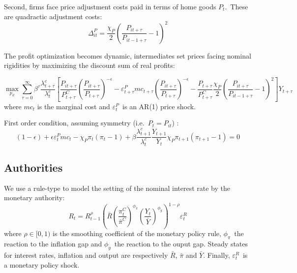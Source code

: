 \documentclass[a4paper,12pt]{article}%
\begin{document}
Second, firms face price adjustment costs paid in terms of home goods $P_{t}%
$.\ These are quadractic adjustment costs:%
\begin{equation}
\Delta_{it}^{P}=\frac{\chi_{P}}{2}\left(  \frac{P_{it+\tau}}{P_{it-1+\tau}%
}-1\right)  ^{2}%
\end{equation}


The profit optimization becomes dynamic, intermediates set prices facing
nominal rigidities by maximizing the discount sum of real profits:%

\begin{equation}
\max_{p_{it}}%
{\displaystyle\sum\limits_{\tau=0}^{\infty}}
\beta^{\tau}\frac{\lambda_{t+\tau}^{c}}{\lambda_{t}^{c}}\left[  \frac
{P_{it+\tau}}{P_{t+\tau}^{C}}\left(  \frac{P_{it+\tau}}{P_{t+\tau}}\right)
^{-\epsilon}-\varepsilon_{t+\tau}^{P}mc_{t+\tau}\left(  \frac{P_{it+\tau}%
}{P_{t+\tau}}\right)  ^{-\epsilon}-\frac{P_{t+\tau}}{P_{t+\tau}^{C}}\frac
{\chi_{P}}{2}\left(  \frac{P_{it+\tau}}{P_{it-1+\tau}}-1\right)  ^{2}\right]
Y_{t+\tau}%
\end{equation}
where $mc_{t}$ is the marginal cost and $\varepsilon_{t}^{P}$\ is an AR(1)
price shock.

First order condition, assuming symmetry (i.e.\ $P_{t}=P_{it}$) :%
\begin{equation}
\left(  1-\epsilon\right)  +\epsilon\varepsilon_{t}^{P}mc_{t}-\chi_{P}\pi
_{t}\left(  \pi_{t}-1\right)  +\beta\frac{\lambda_{t+1}^{c}}{\lambda_{t}^{c}%
}\frac{Y_{t+1}}{Y_{t}}\chi_{P}\pi_{t+1}\left(  \pi_{t+1}-1\right)  =0
\end{equation}


\subsection{Authorities}

We use a \cite{taylor1993discretion} rule-type to model the setting of the
nominal interest rate by the monetary authority:%
\begin{equation}
R_{t}=R_{t-1}^{\rho}\left(  \bar{R}\left(  \frac{\pi_{t}^{C}}{\bar{\pi}^{C}%
}\right)  ^{\phi_{\pi}}\left(  \frac{Y_{t}}{\bar{Y}}\right)  ^{\phi_{y}%
}\right)  ^{1-\rho}\varepsilon_{t}^{R}%
\end{equation}
where $\rho\in\lbrack0,1)$ is the smoothing coefficient of the monetary policy
rule, $\phi_{\pi}$\ the reaction to the inflation gap and $\phi_{y}$\ the
reaction to the ouput gap. Steady states for interest rates, inflation and
output are respectively $\bar{R}$, $\bar{\pi}$ and $\bar{Y}$. Finally,
$\varepsilon_{t}^{R}$\ is a monetary policy shock.
\end{document}
